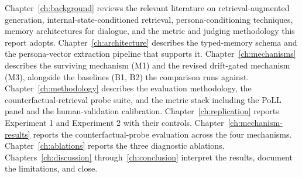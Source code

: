 Chapter~\ref{ch:background} reviews the relevant literature on retrieval-augmented generation, internal-state-conditioned retrieval, persona-conditioning techniques, memory architectures for dialogue, and the metric and judging methodology this report adopts. Chapter~\ref{ch:architecture} describes the typed-memory schema and the persona-vector extraction pipeline that supports it. Chapter~\ref{ch:mechanisms} describes the surviving mechanism (M1) and the revised drift-gated mechanism (M3), alongside the baselines (B1, B2) the comparison runs against. Chapter~\ref{ch:methodology} describes the evaluation methodology, the counterfactual-retrieval probe suite, and the metric stack including the PoLL panel and the human-validation calibration. Chapter~\ref{ch:replication} reports Experiment 1 and Experiment 2 with their controls. Chapter~\ref{ch:mechanism-results} reports the counterfactual-probe evaluation across the four mechanisms. Chapter~\ref{ch:ablations} reports the three diagnostic ablations. Chapters~\ref{ch:discussion} through~\ref{ch:conclusion} interpret the results, document the limitations, and close.
